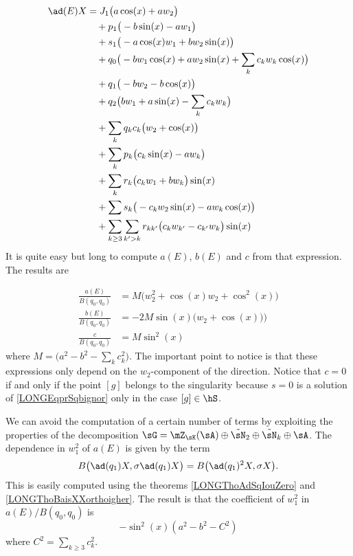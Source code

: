 \begin{equation}
	\begin{aligned}[]
		\ad(E)X	& = J_1\big( a\cos(x)+aw_2 \big)\\
			&\quad +  p_1\big( -b\sin(x)-aw_1 \big)\\
			&\quad+  s_1\big( -a\cos(x)w_1+bw_2\sin(x) \big)\\
			&\quad  +  q_0\big( -bw_1\cos(x)+aw_2\sin(x)+\sum_{k}c_kw_k\cos(x) \big)\\
			&\quad +  q_1\big( -bw_2-b\cos(x) \big)\\
			&\quad +  q_2\big( bw_1+a\sin(x)-\sum_kc_kw_k \big)\\
			&\quad +  \sum_kq_kc_k\big( w_2+\cos(x) \big)\\
			&\quad +  \sum_kp_k\big( c_k\sin(x)-aw_k \big)\\
			&\quad +  \sum_k r_k\big( c_kw_1+bw_k \big)\sin(x)\\
			&\quad +  \sum s_k\big( -c_kw_2\sin(x)-aw_k\cos(x) \big)\\
			&\quad + \sum_{k\geq 3}\sum_{k'>k} r_{kk'}\big( c_kw_{k'}-c_{k'}w_k \big)\sin(x)
	\end{aligned}
\end{equation}
It is quite easy but long to compute $a(E)$, $b(E)$ and $c$ from that expression. The results are
%

\begin{subequations}\label{LONGEqCoefsabcBE}
	\begin{align}
		\frac{ a(E) }{ B(q_0,q_0) }&=M\Big( w_2^2+\cos(x)w_2+\cos^2(x)\Big)	   \label{LONGEqCoeffaE}\\
		\frac{ b(E) }{ B(q_0,q_0) }&=-2M\sin(x)\big( w_2+\cos(x)\big))\\
		\frac{ c }{ B(q_0,q_0) }&=M\sin^2(x)
	\end{align}
\end{subequations}
where $M=\big( a^2-b^2-\sum_kc_k^2 \big)$. The important point to notice is that these expressions only depend on the $w_2$-component of the direction. Notice that $c=0$ if and only if the point $[g]$ belongs to the singularity because $s=0$ is a solution of \eqref{LONGEqprSqbignor} only in the case $[g]\in\hS$.

%
We can avoid the computation of a certain number of terms by exploiting the properties of the decomposition $\sG=\mZ_{\sK}(\sA)\oplus\tilde\sN_2\oplus\tilde\sN_k\oplus\sA$. The dependence in $w_1^2$ of $a(E)$ is given by the term
\begin{equation}
	B\big( \ad(q_1)X,\sigma\ad(q_1)X \big)=B\big( \ad(q_1)^2X,\sigma X \big).
\end{equation}
This is easily computed using the theorems \ref{LONGThoAdSqIouZero} and \ref{LONGThoBaisXXorthoigher}. The result is that the coefficient of $w_1^2$ in $a(E)/B(q_0,q_0)$ is
\begin{equation}
	-\sin^2(x)(a^2-b^2- C^2)
\end{equation}
where $C^2=\sum_{k\geq 3}c_k^2$.

